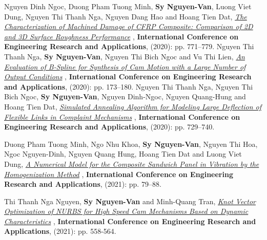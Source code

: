 \documentclass{simplecv}
\begin{document}
\cvitem
{Nguyen Dinh Ngoc, Duong Pham Tuong Minh, {\bf Sy Nguyen-Van}, Luong Viet Dung, Nguyen Thi Thanh Nga, Nguyen Dang Hao and Hoang Tien Dat, 
\href{https://link.springer.com/chapter/10.1007/978-3-030-64719-3_84}{\textit{The Characterization of Machined Damage of CFRP Composite: Comparison of 2D and 3D Surface Roughness Performance}}
, \textbf{International Conference on Engineering Research and Applications}, (2020): pp. 771–779.}
\cvitem
{Nguyen Thi Thanh Nga, {\bf Sy Nguyen-Van}, Nguyen Thi Bich Ngoc and Vu Thi Lien, 
\href{https://link.springer.com/chapter/10.1007/978-3-030-64719-3_20}{\textit{An Evaluation of B-Spline for Synthesis of Cam Motion with a Large Number of Output Conditions}}
, \textbf{International Conference on Engineering Research and Applications}, (2020): pp. 173–180.}
\cvitem
{Nguyen Thi Thanh Nga, Nguyen Thi Bich Ngoc, {\bf Sy Nguyen-Van}, Nguyen Dinh-Ngoc, Nguyen Quang-Hung and Hoang Tien Dat, 
\href{https://link.springer.com/chapter/10.1007/978-3-030-64719-3_79}{\textit{Simulated Annealing Algorithm for Modeling Large Deflection of Flexible Links in Complaint Mechanisms}}
, \textbf{International Conference on Engineering Research and Applications}, (2020): pp. 729–740.}

\cvitem
{Duong Pham Tuong Minh, Ngo Nhu Khoa, {\bf Sy Nguyen-Van}, Nguyen Thi Hoa, Ngoc Nguyen-Dinh, Nguyen Quang Hung, Hoang Tien Dat and Luong Viet Dung, 
	\href{https://doi.org/10.1007/978-3-030-92574-1_8}{\textit{A Numerical Model for the Composite Sandwich Panel in Vibration by the Homogenization Method}}
	, \textbf{International Conference on Engineering Research and Applications}, (2021): pp. 79–88.}


\cvitem
{Thi Thanh Nga Nguyen, {\bf Sy Nguyen-Van} and Minh-Quang Tran, 
	\href{https://doi.org/10.1007/978-3-030-92574-1_8}{\textit{Knot Vector Optimization of NURBS for High Speed Cam Mechanisms Based on Dynamic Characteristics}}
	, \textbf{International Conference on Engineering Research and Applications}, (2021): pp. 558-564.}





\end{document}
